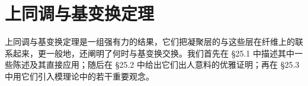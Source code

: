 
\chapter{上同调与基变换定理}
\label{ch:coh-base-change}

上同调与基变换定理是一组强有力的结果，它们把凝聚层的\trHigherPushforward{}与这些层在纤维上的\trCohomology{}联系起来，更一般地，还阐明了\trHigherPushforward{}何时与基变换交换。我们首先在 \S25.1 中描述其中一些陈述及其直接应用；随后在 \S25.2 中给出它们出人意料的优雅证明；再在 \S25.3 中用它们引入模理论中的若干重要观念。




